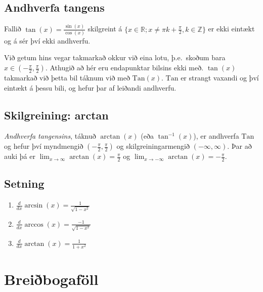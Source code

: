 \documentclass[a4paper,10pt,icelandic]{sphinxmanual}
\begin{document}
\subsection{Andhverfa tangens}
\label{kafli04:andhverfa-tangens}
Fallið \(\tan(x) = \frac{\sin(x)}{\cos(x)}\) skilgreint á
\(\{x \in {{\mathbb  R}}; x \neq \pi k + \frac \pi 2, k \in {{\mathbb Z}}\}\)
er ekki eintækt og á sér því ekki andhverfu.

Við getum hins vegar takmarkað okkur við eina lotu, þ.e. skoðum bara
\(x\in (-\frac \pi 2, \frac \pi 2)\). Athugið að hér eru endapunktar
bilsins ekki með. \(\tan(x)\) takmarkað við þetta bil táknum við með
\({{\text{Tan}}}(x)\). \({{\text{Tan}}}\) er strangt vaxandi og
því eintækt á þessu bili, og hefur þar af leiðandi andhverfu.


\subsection{Skilgreining: arctan}
\label{kafli04:skilgreining-arctan}
\emph{Andhverfa tangensins}, táknuð \(\arctan(x)\) (eða
\(\tan^{-1}(x)\)), er andhverfa \({{\text{Tan}}}\) og hefur því
myndmengið \((-\frac \pi 2,
\frac \pi 2)\) og skilgreiningarmengið \((-\infty,\infty)\). Þar að
auki þá er
\(\lim_{x\to \infty} \arctan(x) = \frac \pi 2\) og
\(\lim_{x\to -\infty} \arctan(x) = -\frac \pi 2\).



\subsection{Setning}
\label{kafli04:id7}\begin{enumerate}
\item {} 
\(\frac d{dx} \arcsin(x) = \frac 1{\sqrt{1-x^2}}\)

\item {} 
\(\frac d{dx} \arccos(x) = \frac {-1}{\sqrt{1-x^2}}\)

\item {} 
\(\frac d{dx} \arctan(x) = \frac 1{1+x^2}\)

\end{enumerate}


\section{Breiðbogaföll}
\label{kafli04:breibogafoll}
\end{document}
